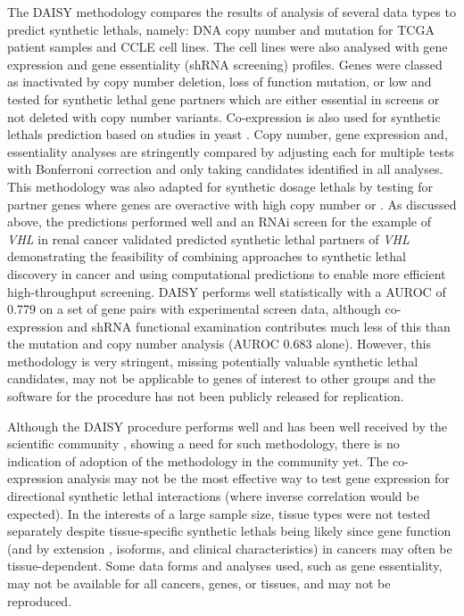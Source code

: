 The \gls{DAISY} methodology \citep{Jerby2014} compares the results of analysis of several data types to predict \glspl{synthetic lethal}, namely: \acrshort{DNA} copy number and  \gls{mutation} for \gls{TCGA} patient samples and \gls{CCLE} cell lines. The cell lines were also analysed with \gls{gene expression} and gene essentiality (\gls{shRNA} screening) profiles. Genes were classed as inactivated by copy number deletion,  loss of function \gls{mutation}, or low  and tested for \gls{synthetic lethal} gene partners which are either \gls{essential} in screens or not deleted with copy number variants. Co-expression is also used for \glspl{synthetic lethal} prediction based on studies in yeast \citep{Costanzo2010, Kelley2005}. Copy number, \gls{gene expression} and, essentiality analyses are stringently compared by adjusting each for multiple tests with Bonferroni correction and only taking candidates identified in all analyses. This methodology was also adapted for \glspl{synthetic dosage lethal} by testing for partner genes where genes are overactive with high copy number or . As discussed above, the predictions performed well and an \gls{RNAi} screen for the example of \textit{VHL} in renal cancer validated predicted \gls{synthetic lethal} partners of \textit{VHL} demonstrating the feasibility of combining approaches to \gls{synthetic lethal} discovery in cancer and using computational predictions to enable more efficient high-throughput screening. \gls{DAISY} performs well statistically with a \gls{AUROC} of 0.779 on a set of gene pairs with experimental screen data, although co-expression and \gls{shRNA} functional examination contributes much less of this than the \gls{mutation} and copy number analysis (\gls{AUROC} 0.683 alone). However, this methodology is very stringent, missing potentially valuable \gls{synthetic lethal} candidates, may not be applicable to genes of interest to other groups and the software for the procedure has not been publicly released for replication.  

Although the \gls{DAISY} procedure performs well and has been well received by the scientific community \citep{Crunkhorn2014, Lokody2014, Ryan2014}, showing a need for such methodology, there is no indication of adoption of the methodology in the community yet. The co-expression analysis may not be the most effective way to test \gls{gene expression} for directional \gls{synthetic lethal} interactions (where inverse correlation would be expected). In the interests of a large sample size, tissue types were not tested separately despite tissue-specific \glspl{synthetic lethal} being likely since gene function (and by extension , isoforms, and clinical characteristics) in cancers may often be tissue-dependent. Some data forms and analyses used, such as gene essentiality, may not be available for all cancers, genes, or tissues, and may not be reproduced.  

